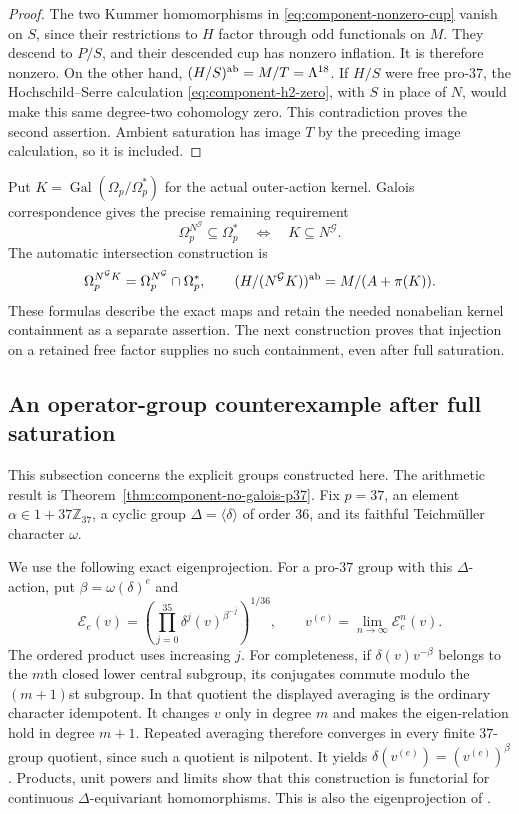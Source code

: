 \begin{proof}
The two Kummer homomorphisms in
\eqref{eq:component-nonzero-cup} vanish on $S$, since their
restrictions to $H$ factor through odd functionals on $M$.
They descend to $P/S$, and their descended cup has nonzero
inflation.  It is therefore nonzero.  On the other hand,
$(H/S)^{\rm ab}=M/T=\Lambda^{18}$.
If $H/S$ were free pro-$37$, the Hochschild--Serre calculation
\eqref{eq:component-h2-zero}, with $S$ in place of $N$, would
make this same degree-two cohomology zero.  This contradiction
proves the second assertion.  Ambient saturation has image
$T$ by the preceding image calculation, so it is included.
\end{proof}

Put $K=\operatorname{Gal}(\Omega_p/\Omega_p^*)$ for the actual
outer-action kernel.  Galois correspondence gives the precise
remaining requirement
\[
 \Omega_p^{N^{\mathcal G}}\subseteq\Omega_p^*
 \quad\Longleftrightarrow\quad K\subseteq N^{\mathcal G}.
\]
The automatic intersection construction is
\[
 \Omega_p^{N^{\mathcal G}K}
   =\Omega_p^{N^{\mathcal G}}\cap\Omega_p^*,
 \qquad
 (H/(N^{\mathcal G}K))^{\rm ab}
   =M/(A+\pi(K)).
\]
These formulas describe the exact maps and retain the needed
nonabelian kernel containment as a separate assertion.
The next construction proves that injection on a retained free
factor supplies no such containment, even after full saturation.

\subsection{An operator-group counterexample after full saturation}

This subsection concerns the explicit groups constructed here.
The arithmetic result is Theorem~\ref{thm:component-no-galois-p37}.
Fix $p=37$, an element $\alpha\in1+37\mathbb Z_{37}$, a
cyclic group $\Delta=\langle\delta\rangle$ of order $36$, and
its faithful Teichm\"uller character $\omega$.

We use the following exact eigenprojection.  For a pro-$37$ group
with this $\Delta$-action, put $\beta=\omega(\delta)^e$ and
\[
 \mathcal E_e(v)=
 \left(\prod_{j=0}^{35}\delta^j(v)^{\beta^{-j}}\right)^{1/36},
 \qquad
 v^{(e)}=\lim_{n\to\infty}\mathcal E_e^n(v).
\]
The ordered product uses increasing $j$.
For completeness, if $\delta(v)v^{-\beta}$ belongs to the
$m$th closed lower central subgroup, its conjugates commute
modulo the $(m+1)$st subgroup.  In that quotient the displayed
averaging is the ordinary character idempotent.  It changes $v$
only in degree $m$ and makes the eigen-relation hold in degree
$m+1$.  Repeated averaging therefore converges in every finite
$37$-group quotient, since such a quotient is nilpotent.
It yields $\delta(v^{(e)})=(v^{(e)})^\beta$.
Products, unit powers and limits show that this construction is
functorial for continuous $\Delta$-equivariant homomorphisms.
This is also the eigenprojection of
\cite[Lemma~4]{Sharifi}.

